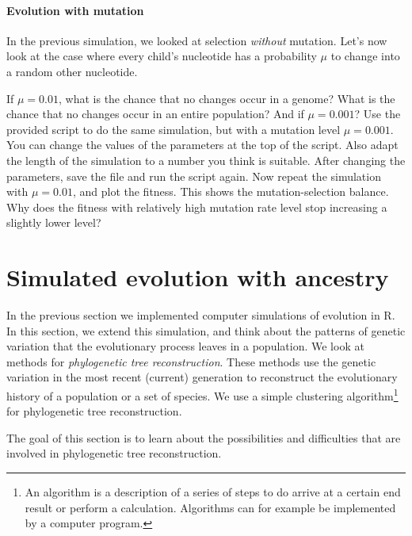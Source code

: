 \documentclass[a4paper, 9pt]{article}
\begin{document}
\paragraph{Evolution with mutation}

In the previous simulation, we looked at selection \textit{without}
mutation. Let's now look at the case where every child's nucleotide has
a probability $\mu$ to change into a random other nucleotide.

\begin{exercise}
    \askstar If $\mu=0.01$, what is the chance that no changes occur in a genome? What is the chance that no changes occur in an entire population? And if $\mu=0.001$?
    \action Use the provided  script to do the same simulation, but with a mutation level $\mu=0.001$. You can change the values of the parameters at the top of the script. Also adapt the length of the simulation to a number you think is suitable. After changing the parameters, save the file and run the script again. 
    \action Now repeat the simulation with $\mu=0.01$, and plot the fitness. This shows the mutation-selection balance.
    \askstar Why does the fitness with relatively high mutation rate level stop increasing a slightly lower level?
\end{exercise}

\section{Simulated evolution with ancestry}\label{simulated-evolution-continued}
In the previous section we implemented computer simulations of evolution in R. In this section, we extend this simulation, and think about the patterns of genetic variation that the evolutionary process leaves in a population. We look at methods for \emph{phylogenetic tree reconstruction}. These methods use the genetic variation in the most recent (current) generation to reconstruct the evolutionary history of a population or a set of species. We use a simple clustering algorithm\footnote{An algorithm is a description of a series of steps to do arrive at a certain end result or perform a calculation. Algorithms can for example be implemented by a computer program.} for phylogenetic tree reconstruction. 

\begin{goals}
The goal of this section is to learn about the possibilities and difficulties that are involved in phylogenetic tree reconstruction.
\end{goals}
\end{document}
